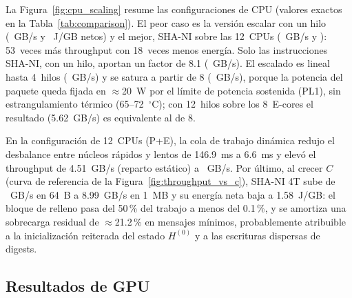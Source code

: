 \documentclass[conference]{IEEEtran}
\begin{document}
La Figura~\ref{fig:cpu_scaling} resume las configuraciones de CPU (valores exactos en la Tabla~\ref{tab:comparison}). El peor caso es la versión escalar con un hilo (\macrocputputscalar~GB/s y \macrocpuenergyscalarnet~J/GB netos) y el mejor, SHA-NI sobre las 12~CPUs (\macrocputputtwelvepe~GB/s y \macrocpuenergytwelvepenets): 53~veces más throughput con 18~veces menos energía. Solo las instrucciones SHA-NI, con un hilo, aportan un factor de 8.1 (\macrocputputshani~GB/s). El escalado es lineal hasta 4~hilos (\macrocputputfour~GB/s) y se satura a partir de 8 (\macrocputputeight~GB/s), porque la potencia del paquete queda fijada en $\approx$20~W por el límite de potencia sostenida (PL1), sin estrangulamiento térmico (65--72~$^\circ$C); con 12~hilos sobre los 8~E-cores el resultado (5.62~GB/s) es equivalente al de 8.

En la configuración de 12~CPUs (P+E), la cola de trabajo dinámica redujo el desbalance entre núcleos rápidos y lentos de 146.9~ms a 6.6~ms y elevó el throughput de 4.51~GB/s (reparto estático) a \macrocputputtwelvepe~GB/s. Por último, al crecer $C$ (curva de referencia de la Figura~\ref{fig:throughput_vs_c}), SHA-NI 4T sube de \macrocputputfour~GB/s en 64~B a 8.99~GB/s en 1~MB y su energía neta baja a 1.58~J/GB: el bloque de relleno pasa del 50\,\% del trabajo a menos del 0.1\,\%, y se amortiza una sobrecarga residual de $\approx$21.2\,\% en mensajes mínimos, probablemente atribuible a la inicialización reiterada del estado $H^{(0)}$ y a las escrituras dispersas de digests.

\subsection{Resultados de GPU}
\end{document}
